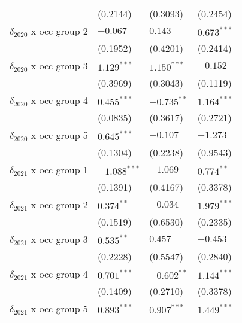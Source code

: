 \begin{tabular}{llll}
                                       &           (0.2144) &           (0.3093) &           (0.2454) \\
$\delta_{2020}$ x occ group 2          &           $-0.067$ &            $0.143$ &      $0.673^{***}$ \\
                                       &           (0.1952) &           (0.4201) &           (0.2414) \\
$\delta_{2020}$ x occ group 3          &      $1.129^{***}$ &      $1.150^{***}$ &           $-0.152$ \\
                                       &           (0.3969) &           (0.3043) &           (0.1119) \\
$\delta_{2020}$ x occ group 4          &      $0.455^{***}$ &      $-0.735^{**}$ &      $1.164^{***}$ \\
                                       &           (0.0835) &           (0.3617) &           (0.2721) \\
$\delta_{2020}$ x occ group 5          &      $0.645^{***}$ &           $-0.107$ &           $-1.273$ \\
                                       &           (0.1304) &           (0.2238) &           (0.9543) \\
$\delta_{2021}$ x occ group 1          &     $-1.088^{***}$ &           $-1.069$ &       $0.774^{**}$ \\
                                       &           (0.1391) &           (0.4167) &           (0.3378) \\
$\delta_{2021}$ x occ group 2          &       $0.374^{**}$ &           $-0.034$ &      $1.979^{***}$ \\
                                       &           (0.1519) &           (0.6530) &           (0.2335) \\
$\delta_{2021}$ x occ group 3          &       $0.535^{**}$ &            $0.457$ &           $-0.453$ \\
                                       &           (0.2228) &           (0.5547) &           (0.2840) \\
$\delta_{2021}$ x occ group 4          &      $0.701^{***}$ &      $-0.602^{**}$ &      $1.144^{***}$ \\
                                       &           (0.1409) &           (0.2710) &           (0.3378) \\
$\delta_{2021}$ x occ group 5          &      $0.893^{***}$ &      $0.907^{***}$ &      $1.449^{***}$ \\

\end{tabular}
